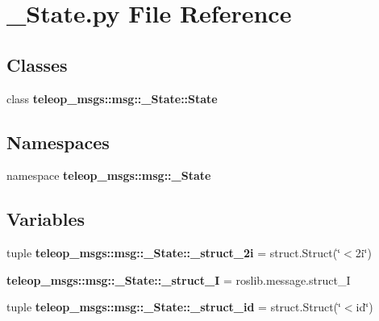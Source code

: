 \section{\_\-State.py File Reference}
\label{__State_8py}
\subsection*{Classes}
\begin{DoxyCompactItemize}
\item 
class {\bf teleop\_\-msgs::msg::\_\-State::State}
\end{DoxyCompactItemize}
\subsection*{Namespaces}
\begin{DoxyCompactItemize}
\item 
namespace {\bf teleop\_\-msgs::msg::\_\-State}
\end{DoxyCompactItemize}
\subsection*{Variables}
\begin{DoxyCompactItemize}
\item 
tuple {\bf teleop\_\-msgs::msg::\_\-State::\_\-struct\_\-2i} = struct.Struct(\char`\"{}$<$2i\char`\"{})
\item 
{\bf teleop\_\-msgs::msg::\_\-State::\_\-struct\_\-I} = roslib.message.struct\_\-I
\item 
tuple {\bf teleop\_\-msgs::msg::\_\-State::\_\-struct\_\-id} = struct.Struct(\char`\"{}$<$id\char`\"{})
\end{DoxyCompactItemize}
